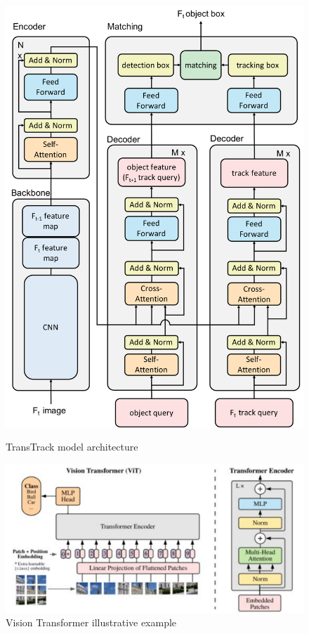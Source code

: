 \documentclass[12pt, a4paper]{article}
\begin{document}
\begin{figure}[h]
    \centering
    \begin{minipage}{0.3\textwidth}
        \centering
        \includegraphics[width=\linewidth]{pictures/transTrack_model.pdf}
        \caption{TransTrack model architecture}
        \label{fig:Transtrack_model}
    \end{minipage}
    \hfill
    \begin{minipage}{0.6\textwidth}
        \centering
        \includegraphics[width=\linewidth]{pictures/VisionTransformer.pdf}
        \caption{Vision Transformer illustrative example}
        \label{fig:vision_trasformer}
    \end{minipage}
\end{figure}
\end{document}
